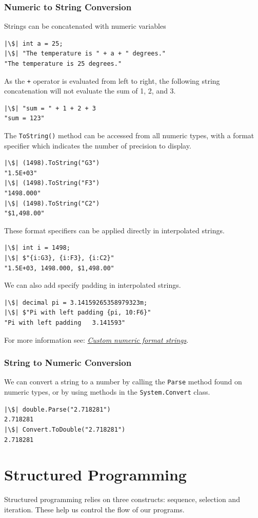\documentclass{article}
\begin{document}
\subsubsection{Numeric to String Conversion}
Strings can be concatenated with numeric variables
\begin{verbatim}
|\$| int a = 25;
|\$| "The temperature is " + a + " degrees."
"The temperature is 25 degrees."
\end{verbatim}
As the \texttt{+} operator is evaluated from left to right,
the following string concatenation will not evaluate the sum of 1, 2,
and 3.
\begin{verbatim}
|\$| "sum = " + 1 + 2 + 3
"sum = 123"
\end{verbatim}
The \texttt{ToString()} method can be accessed from all
numeric types, with a format specifier which indicates the number of
precision to display.
\begin{verbatim}
|\$| (1498).ToString("G3")
"1.5E+03"
|\$| (1498).ToString("F3")
"1498.000"
|\$| (1498).ToString("C2")
"$1,498.00"
\end{verbatim}
These format specifiers can be applied directly in interpolated
strings.
\begin{verbatim}
|\$| int i = 1498;
|\$| $"{i:G3}, {i:F3}, {i:C2}"
"1.5E+03, 1498.000, $1,498.00"
\end{verbatim}
We can also add specify padding in interpolated strings.
\begin{verbatim}
|\$| decimal pi = 3.14159265358979323m;
|\$| $"Pi with left padding {pi, 10:F6}"
"Pi with left padding   3.141593"
\end{verbatim}
For more information see:
\href{https://docs.microsoft.com/en-us/dotnet/standard/base-types/custom-numeric-format-strings}{\textit{Custom
numeric format strings}}.
\subsubsection{String to Numeric Conversion}
We can convert a string to a number by calling the
\texttt{Parse} method found on numeric types, or by using
methods in the \texttt{System.Convert} class.
\begin{verbatim}
|\$| double.Parse("2.718281")
2.718281
|\$| Convert.ToDouble("2.718281")
2.718281
\end{verbatim}
\section{Structured Programming}
Structured programming relies on three constructs: sequence, selection
and iteration. These help us control the flow of our programs.
\end{document}
